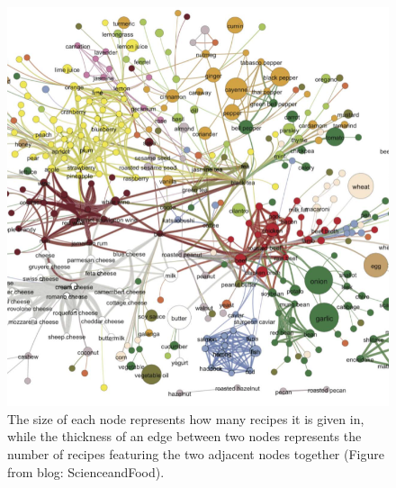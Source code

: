 \documentclass[12pt]{article}
\begin{document}
\begin{figure}[htbp]
\begin{center}
\includegraphics[]{foodnet.png}
\caption{The size of each node represents how many recipes it is given in, while the thickness of an edge between two nodes represents the number of recipes featuring the two adjacent nodes together (Figure from blog: ScienceandFood).}
\label{default}
\end{center}
\end{figure}
 
\end{document}
